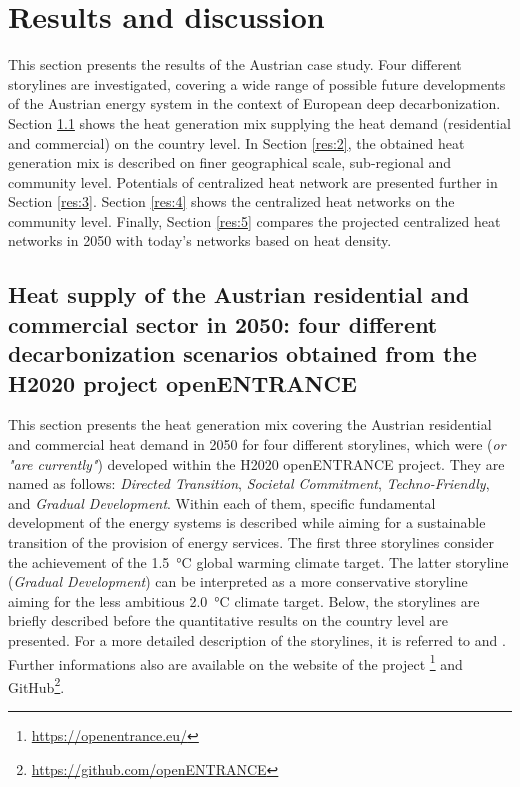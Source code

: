 \section{Results and discussion}\label{results}
This section presents the results of the Austrian case study. Four different storylines are investigated, covering a wide range of possible future developments of the Austrian energy system in the context of European deep decarbonization. Section \ref{res:1} shows the heat generation mix supplying the heat demand (residential and commercial) on the country level. In Section \ref{res:2}, the obtained heat generation mix is described on finer geographical scale, sub-regional and community level. Potentials of centralized heat network are presented further in Section \ref{res:3}. Section \ref{res:4} shows the centralized heat networks on the community level. Finally, Section \ref{res:5} compares the projected centralized heat networks in 2050 with today's networks based on heat density.

\subsection{Heat supply of the Austrian residential and commercial sector in 2050: four different decarbonization scenarios obtained from the H2020 project openENTRANCE}\label{res:1}
This section presents the heat generation mix covering the Austrian residential and commercial heat demand in 2050 for four different storylines, which were (\textit{or "are currently"}) developed within the H2020 openENTRANCE project. They are named as follows: \textit{Directed Transition}, \textit{Societal Commitment}, \textit{Techno-Friendly}, and \textit{Gradual Development}. Within each of them, specific fundamental development of the energy systems is described while aiming for a sustainable transition of the provision of energy services. The first three storylines consider the achievement of the \SI{1.5}{\degreeCelsius} global warming climate target. The latter storyline (\textit{Gradual Development}) can be interpreted as a more conservative storyline aiming for the less ambitious \SI{2.0}{\degreeCelsius} climate target. Below, the storylines are briefly described before the quantitative results on the country level are presented. For a more detailed description of the storylines, it is referred to \cite{auer2020quantitative} and \cite{auer2020development}. Further informations also are available on the website of the project \footnote{\url{https://openentrance.eu/}} and GitHub\footnote{\url{https://github.com/openENTRANCE}}.\vspace{0.3cm}

